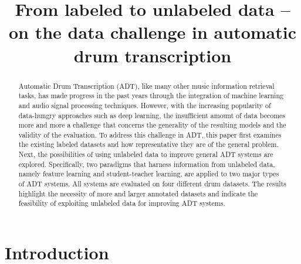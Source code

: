 \documentclass{article}
\title{From labeled to unlabeled data -- on the data challenge in automatic drum transcription}
\begin{document}
%
\maketitle
%
\begin{abstract}
Automatic Drum Transcription (ADT), like many other music information retrieval tasks, has made progress in the past years through the integration of machine learning and audio signal processing techniques. However, with the increasing popularity of data-hungry approaches such as deep learning, the insufficient amount of data becomes more and more a challenge that concerns the generality of the resulting models and the validity of the evaluation. To address this challenge in ADT, this paper first examines the existing labeled datasets and how representative they are of the general problem. Next, the possibilities of using unlabeled data to improve general ADT systems are explored. Specifically, two paradigms that harness information from unlabeled data, namely feature learning and student-teacher learning, are applied to two major types of ADT systems. All systems are evaluated on four different drum datasets. The results highlight the necessity of more and larger annotated datasets and indicate the feasibility of exploiting unlabeled data for improving ADT systems.
\end{abstract}

%
\section{Introduction}\label{sec:introduction}
\end{document}
